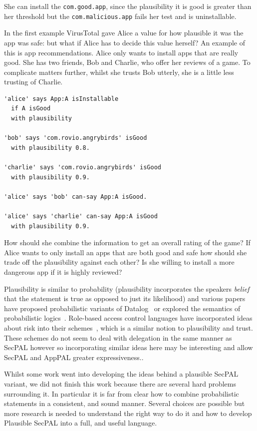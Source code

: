 \documentclass[thesis.tex]{subfiles}
\begin{document}
She can install the \texttt{com.good.app}, since the plausibility it is good is
greater than her threshold but the \texttt{com.malicious.app} fails her test and
is uninstallable. 

In the first example VirusTotal gave Alice a value for how plausible it was the
app was safe: but what if Alice has to decide this value herself? An example of
this is app recommendations. Alice only wants to install apps that are really
good. She has two friends, Bob and Charlie, who offer her reviews of a game. To
complicate matters further, whilst she trusts Bob utterly, she is a little less
trusting of Charlie.

\begin{lstlisting}
'alice' says App:A isInstallable
  if A isGood
  with plausibility

'bob' says 'com.rovio.angrybirds' isGood
  with plausibility 0.8.

'charlie' says 'com.rovio.angrybirds' isGood
  with plausibility 0.9.

'alice' says 'bob' can-say App:A isGood.

'alice' says 'charlie' can-say App:A isGood
  with plausibility 0.9.
\end{lstlisting}

How should she combine the information to get an overall rating of the game? If
Alice wants to only install an apps that are both good and safe how should she
trade off the plausibility against each other? Is she willing to install a more
dangerous app if it is highly reviewed?

Plausibility is similar to probability (plausibility incorporates the speakers
\emph{belief} that the statement is true as opposed to just its likelihood) and
various papers have proposed probabilistic variants of
Datalog~\cite{fuhr_probabilistic_1995} or explored the semantics of
probabilistic logics~\cite{halpern_analysis_1990}. Role-based access control
languages have incorporated ideas about risk into their
schemes~\cite{josang_analysing_2004,dimmock_using_2004,salim_approach_2011},
which is a similar notion to plausibility and trust. These schemes do not seem
to deal with delegation in the same manner as SecPAL however so incorporating
similar ideas here may be interesting and allow SecPAL and AppPAL greater
expressiveness..

Whilst some work went into developing the ideas behind a plausible SecPAL
variant, we did not finish this work because there are several hard problems
surrounding it. In particular it is far from clear how to combine probabilistic
statements in a consistent, and sound manner. Several choices are possible but
more research is needed to understand the right way to do it and how to develop
Plausible SecPAL into a full, and useful language.
\end{document}
